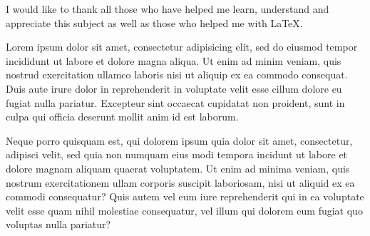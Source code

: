 %

I would like to thank all those who have helped me learn, understand and 
appreciate this subject as well as those who helped me with \LaTeX.

Lorem ipsum dolor sit amet, consectetur adipisicing elit, sed do eiusmod
tempor incididunt ut labore et dolore magna aliqua. Ut enim ad minim veniam,
quis nostrud exercitation ullamco laboris nisi ut aliquip ex ea commodo
consequat. Duis aute irure dolor in reprehenderit in voluptate velit esse
cillum dolore eu fugiat nulla pariatur. Excepteur sint occaecat cupidatat
non proident, sunt in culpa qui officia deserunt mollit anim id est laborum.

Neque porro quisquam est, qui dolorem ipsum quia dolor sit amet, consectetur, 
adipisci velit, sed quia non numquam eius modi tempora incidunt ut labore et 
dolore magnam aliquam quaerat voluptatem. Ut enim ad minima veniam, quis 
nostrum exercitationem ullam corporis suscipit laboriosam, nisi ut aliquid 
ex ea commodi consequatur? Quis autem vel eum iure reprehenderit qui in ea 
voluptate velit esse quam nihil molestiae consequatur, vel illum qui dolorem 
eum fugiat quo voluptas nulla pariatur?
